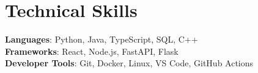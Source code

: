 \documentclass[letterpaper,11pt]{article}
\begin{document}
\section{Technical Skills}
 \begin{itemize}[leftmargin=0.15in, label={}]
    \small{\item{
     \textbf{Languages}{: Python, Java, TypeScript, SQL, C++} \\
     \textbf{Frameworks}{: React, Node.js, FastAPI, Flask} \\
     \textbf{Developer Tools}{: Git, Docker, Linux, VS Code, GitHub Actions}
    }}
 \end{itemize}
\end{document}
